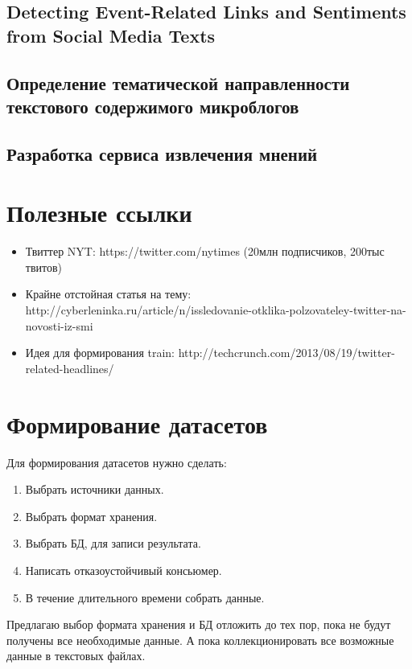 \documentclass[12pt,a4paper,oneside]{extarticle}
\begin{document}
    \subsection{Detecting Event-Related Links and Sentiments from Social Media Texts}
    \subsection{Определение тематической направленности текстового содержимого микроблогов}
    \subsection{Разработка сервиса извлечения мнений}
    

\section{Полезные ссылки}
    \begin{itemize}
        \item Твиттер NYT: https://twitter.com/nytimes (20млн подписчиков, 200тыс твитов)
        \item Крайне отстойная статья на тему: http://cyberleninka.ru/article/n/issledovanie-otklika-polzovateley-twitter-na-novosti-iz-smi
        \item Идея для формирования train: http://techcrunch.com/2013/08/19/twitter-related-headlines/
    \end{itemize}
\clearpage

\section{Формирование датасетов}
    Для формирования датасетов нужно сделать:
    \begin{enumerate}
        \item Выбрать источники данных.
        \item Выбрать формат хранения.
        \item Выбрать БД, для записи результата.
        \item Написать отказоустойчивый консьюмер.
        \item В течение длительного времени собрать данные.
    \end{enumerate}

    Предлагаю выбор формата хранения и БД отложить до тех пор, пока не будут получены все необходимые данные. А пока коллекционировать все возможные данные в текстовых файлах.
\end{document}

